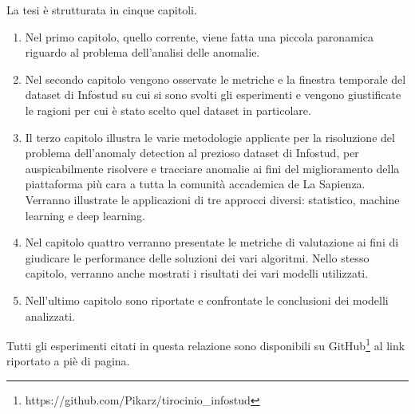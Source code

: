     La tesi è strutturata in cinque capitoli.
    \begin{enumerate}
        \item Nel primo capitolo, quello corrente, viene fatta una piccola paronamica riguardo al problema dell'analisi delle anomalie.
        \item Nel secondo capitolo vengono osservate le metriche e la finestra temporale del dataset di Infostud su cui si 
                sono svolti gli esperimenti e vengono giustificate le ragioni per cui è stato scelto quel dataset in particolare.
        \item Il terzo capitolo illustra le varie metodologie applicate per la risoluzione del problema dell'anomaly detection
                al prezioso dataset di Infostud, per auspicabilmente risolvere e tracciare anomalie ai fini del miglioramento 
                della piattaforma più cara a tutta la comunità accademica de La Sapienza. Verranno illustrate le applicazioni di 
                tre approcci diversi: statistico, machine learning e deep learning.
        \item Nel capitolo quattro verranno presentate le metriche di valutazione ai fini di giudicare le performance delle soluzioni 
                dei vari algoritmi. Nello stesso capitolo, verranno anche mostrati i risultati dei vari modelli utilizzati.           
        \item Nell'ultimo capitolo sono riportate e confrontate le conclusioni dei modelli analizzati.           
    \end{enumerate}


    Tutti gli esperimenti citati in questa relazione sono disponibili su 
    GitHub\footnote{https://github.com/Pikarz/tirocinio\_infostud} al link riportato a piè di pagina.